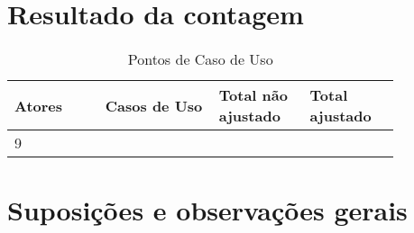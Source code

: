 \vfill
\pagebreak
\section{Resultado da contagem}

\begin{table*}[!h]
\centering
\caption{Pontos de Caso de Uso}
\label{Rotulo}
  \begin{tabular}{|p{0.20\linewidth}|p{0.25\linewidth}|p{0.20\linewidth}|p{0.20\linewidth}|}
  \hline
  \textbf{Atores} & \textbf{Casos de Uso} & \textbf{Total não ajustado} & \textbf{Total ajustado} \\ 
  \hline

  9 & & &\\
  \hline
  \end{tabular}
\end{table*}

\section{Suposições e observações gerais}

